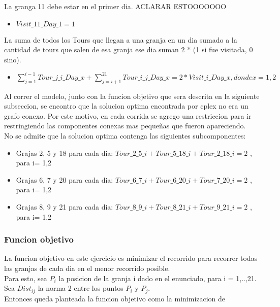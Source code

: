 La granga 11 debe estar en el primer dia. ACLARAR ESTOOOOOOO \\
\begin{itemize}
\item $ Visit\_11\_Day\_1 = 1$ \\
\end{itemize}

La suma de todos los Tours que llegan a una granja en un dia sumado a la cantidad de tours que salen de esa granja ese dia suman 2 * (1 si fue visitada, 0 sino).

\begin{itemize}
\item $ \sum_{j = 1}^{i-1} Tour\_j\_i\_Day\_x + \sum_{j=i+1}^{21} Tour\_i\_j\_Day\_x = 2 * Visit\_i\_Day\_x            , donde	x = 1,2 $\\
\end{itemize}

Al correr el modelo, junto con la funcion objetivo que sera descrita en la siguiente subseccion, se encontro que la solucion optima encontrada por cplex no era un grafo conexo. Por este motivo, en cada corrida se agrego una restriccion para ir restringiendo las componentes conexas mas peque\~nas que fueron apareciendo. \\

No se admite que la solucion optima contenga las siguientes subcomponentes: \\
\begin{itemize}
\item Grajas 2, 5 y 18 para cada dia: $Tour\_2\_5\_i + Tour\_5\_18\_i + Tour\_2\_18\_i = 2$ , para i= 1,2\\
\item Grajas 6, 7 y 20 para cada dia: $Tour\_6\_7\_i + Tour\_6\_20\_i + Tour\_7\_20\_i = 2$ , para i= 1,2\\
\item Grajas 8, 9 y 21 para cada dia: $Tour\_8\_9\_i + Tour\_8\_21\_i + Tour\_9\_21\_i = 2$ , para i= 1,2\\
\end{itemize}

\subsubsection{Funcion objetivo}

La funcion objetivo en este ejercicio es minimizar el recorrido para recorrer todas las granjas de cada dia en el menor recorrido posible.\\
Para esto, sea $P_i$ la posicion de la granja i dado en el enunciado, para i = 1,..,21. \\
Sea $Dist_{ij}$ la norma 2 entre los puntos $P_i$ y $P_j$. \\
Entonces queda planteada la funcion objetivo como la minimizacion de \\

